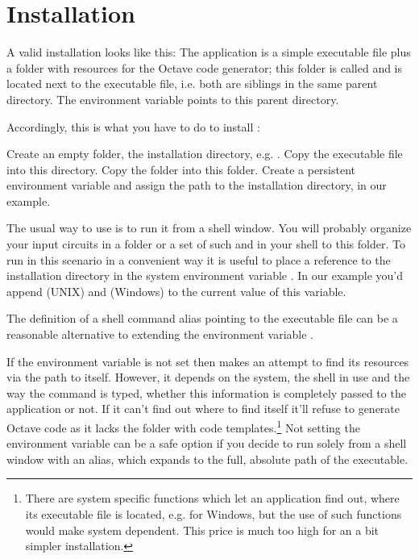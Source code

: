 \chapter{Installation}

A valid installation looks like this: The \linnet{} application is a
simple executable file plus a folder with resources for the Octave code
generator; this folder is called  and is located next to the
\linnet{} executable file, i.e. both are siblings in the same parent
directory. The environment variable  points to this
parent directory.

Accordingly, this is what you have to do to install \linnet{}: 

Create an empty folder, the installation directory, e.g.
. Copy the \linnet{} executable file into this
directory. Copy the folder  into this folder. Create a
persistent environment variable  and assign the path to
the installation directory,  in our example.

The usual way to use \linnet{} is to run it from a shell window. You will
probably organize your input circuits in a folder or a set of such and
 in your shell to this folder. To run \linnet{} in this scenario
in a convenient way it is useful to place a reference to the installation
directory in the system environment variable . In our example
you'd append  (UNIX) and
 (Windows) to the current value of
this variable.

The definition of a shell command alias pointing to the \linnet{}
executable file can be a reasonable alternative to extending the
environment variable .

If the environment variable is not set then \linnet{} makes an attempt to
find its resources via the path to itself. However, it depends on the
system, the shell in use and the way the command is typed, whether this
information is completely passed to the application or not. If it can't
find out where to find itself it'll refuse to generate Octave code as it
lacks the folder  with code templates.\footnote{There are
system specific functions which let an application find out, where its
executable file is located, e.g.  for Windows, but
the use of such functions would make \linnet{} system dependent. This
price is much too high for an a bit simpler installation.} Not setting the
environment variable can be a safe option if you decide to run \linnet{}
solely from a shell window with an alias, which expands to the full,
absolute path of the executable.


